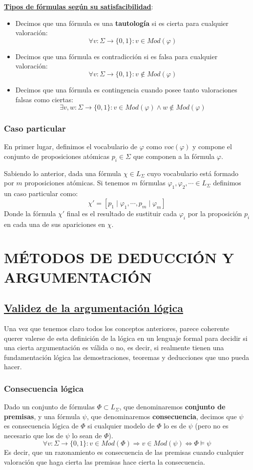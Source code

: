 \documentclass[10pt,a4paper,openright]{book}
\begin{document}
\underline{\textbf{Tipos de fórmulas según su satisfacibilidad}}:
\begin{itemize}
\item Decimos que una fórmula es una \textbf{tautología} si es cierta para cualquier valoración:
$$\forall v: \Sigma \rightarrow \{0,1\}: v\in Mod(\varphi)$$
\item Decimos que una fórmula es contradicción si es falsa para cualquier valoración:
$$\forall v: \Sigma \rightarrow \{0,1\}: v\notin Mod(\varphi)$$
\item Decimos que una fórmula es contingencia cuando posee tanto valoraciones falsas como ciertas:
$$\exists v, w: \Sigma \rightarrow \{0,1\}: v\in Mod(\varphi) \wedge w\notin Mod(\varphi)$$
\end{itemize}

\subsubsection*{Caso particular}
En primer lugar, definimos el vocabulario de $\varphi$ como $voc(\varphi)$ y compone el conjunto de proposiciones atómicas $p_i\in \Sigma$ que componen a la fórmula $\varphi$.

Sabiendo lo anterior, dada una fórmula $\chi\in L_\Sigma$ cuyo vocabulario está formado por $m$ proposiciones atómicas. Si tenemos $m$ fórmulas $\varphi_1, \varphi_2, \cdots \in L_\Sigma$ definimos un caso particular como:
$$\chi' = [p_1\mid \varphi_1, \cdots , p_m\mid \varphi_m]$$
Donde la fórmula $\chi'$ final es el resultado de sustituir cada $\varphi_i$ por la proposición $p_i$ en cada una de sus apariciones en $\chi$.

\section*{MÉTODOS DE DEDUCCIÓN Y ARGUMENTACIÓN}
\subsection*{\underline{Validez de la argumentación lógica}}
Una vez que tenemos claro todos los conceptos anteriores, parece coherente querer valerse de esta definición de la lógica en un lenguaje formal para decidir si una cierta argumentación es válida o no, es decir, si realmente tienen una fundamentación lógica las demostraciones, teoremas y deducciones que uno pueda hacer.

\subsubsection*{Consecuencia lógica}
Dado un conjunto de fórmulas $\Phi \subset L_\Sigma$, que denominaremos \textbf{conjunto de premisas}, y una fórmula $\psi$, que denominaremos \textbf{consecuencia}, decimos que $\psi$ es consecuencia lógica de $\Phi$ si cualquier modelo de $\Phi$ lo es de $\psi$ (pero no es necesario que los de $\psi$ lo sean de $\Phi$).
$$\forall v: \Sigma \rightarrow \{0,1\}: v\in Mod (\Phi)\Rightarrow  v\in Mod (\psi) \Leftrightarrow \Phi \models \psi$$
Es decir, que un razonamiento es consecuencia de las premisas cuando cualquier valoración que haga cierta las premisas hace cierta la consecuencia.
\end{document}
